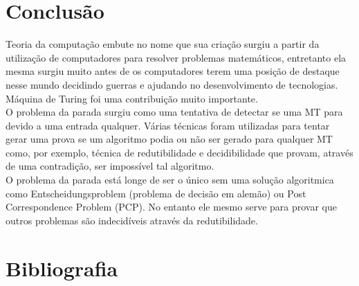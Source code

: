\documentclass[a4paper,10pt]{article}
\begin{document}
\section{Conclus\~ao}

Teoria da computação embute no nome que sua criação surgiu a partir da utilização de computadores para resolver problemas matemáticos, entretanto ela mesma surgiu muito antes de os computadores terem uma posição de destaque nesse mundo decidindo guerras e ajudando no desenvolvimento de tecnologias. Máquina de Turing foi uma contribuição muito importante.\\
O problema da parada surgiu como uma tentativa de detectar se uma MT para devido a uma entrada qualquer. Várias técnicas foram utilizadas para tentar gerar uma prova se um algoritmo podia ou não ser gerado para qualquer MT como, por exemplo, técnica de redutibilidade e decidibilidade que provam, através de uma contradição, ser impossível tal algoritmo.\\
O problema da parada está longe de ser o único sem uma solução algoritmica como Entscheidungsproblem (problema de decisão em alemão)  ou Post Correspondence Problem (PCP). No entanto ele mesmo serve para provar que outros problemas são indecidíveis através da redutibilidade.\\

\section{Bibliografia}


\end{document}
